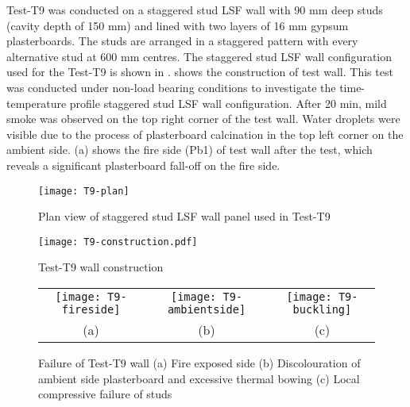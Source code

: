 Test-T9 was conducted on a staggered stud LSF wall with 90 mm deep studs (cavity depth of 150 mm) and lined with two layers of 16 mm gypsum plasterboards. The studs are arranged in a staggered pattern with every alternative stud at 600 mm centres. The staggered stud LSF wall configuration used for the Test-T9 is shown in .  shows the construction of test wall. This test was conducted under non-load bearing conditions to investigate the time-temperature profile staggered stud LSF wall configuration. After 20 min, mild smoke was observed on the top right corner of the test wall. Water droplets were visible due to the process of plasterboard calcination in the top left corner on the ambient side. (a) shows the fire side (Pb1) of test wall after the test, which reveals a significant plasterboard fall-off on the fire side. 
\begin{figure}[!htbp]
	\centering
		\texttt{[image: T9-plan]}
		\caption{Plan view of staggered stud LSF wall panel used in Test-T9}
		\label{fig:T9-plan}
\end{figure}
\begin{figure}[htbp]
	\centering
	\texttt{[image: T9-construction.pdf]}
	\caption{Test-T9 wall construction}
	\label{fig:T9-construction}
\end{figure}
\begin{figure}[!htbp]
	\centering
		\begin{tabular}{ccc}
			\texttt{[image: T9-fireside]} &
			 \texttt{[image: T9-ambientside]} & 
			 \texttt{[image: T9-buckling]} \\ 
			(a) & (b) & (c)  \\ 
		\end{tabular} 
		\caption{Failure of Test-T9 wall (a) Fire exposed side (b) Discolouration of ambient side plasterboard and excessive thermal bowing (c) Local compressive failure of studs}
		\label{fig:T9-failure}
\end{figure}

